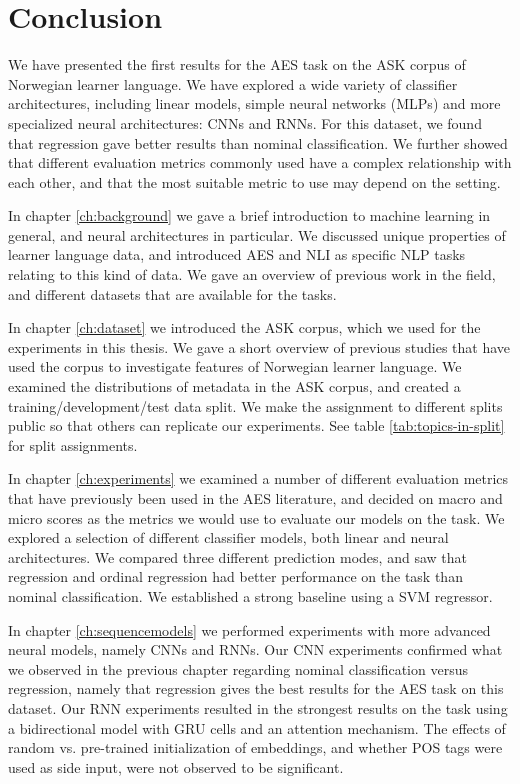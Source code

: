 \chapter{Conclusion} \label{ch:conclusion}

We have presented the first results for the \ac{AES} task on the ASK corpus
of Norwegian learner language. We have explored a wide variety of classifier
architectures, including linear models, simple neural networks (\acp{MLP})
and more specialized neural architectures: \acp{CNN} and \acp{RNN}. For this
dataset, we found that regression gave better results than nominal
classification. We further showed that different evaluation metrics commonly
used have a complex relationship with each other, and that the most suitable
metric to use may depend on the setting.

In chapter \ref{ch:background} we gave a brief introduction to machine
learning in general, and neural architectures in particular. We discussed
unique properties of learner language data, and introduced \ac{AES} and
\ac{NLI} as specific \ac{NLP} tasks relating to this kind of data. We gave an
overview of previous work in the field, and different datasets that are
available for the tasks.

In chapter \ref{ch:dataset} we introduced the ASK corpus, which we used for
the experiments in this thesis. We gave a short overview of previous studies
that have used the corpus to investigate features of Norwegian learner
language. We examined the distributions of metadata in the ASK corpus, and
created a training/development/test data split. We make the assignment to
different splits public so that others can replicate our experiments. See
table \ref{tab:topics-in-split} for split assignments.

In chapter \ref{ch:experiments} we examined a number of different evaluation
metrics that have previously been used in the \ac{AES} literature, and
decided on macro and micro \FI scores as the metrics we would use to evaluate
our models on the task. We explored a selection of different classifier
models, both linear and neural architectures. We compared three different
prediction modes, and saw that regression and ordinal regression had better
performance on the task than nominal classification. We established a strong
baseline using a \ac{SVM} regressor.

In chapter \ref{ch:sequencemodels} we performed experiments with more
advanced neural models, namely \acp{CNN} and \acp{RNN}. Our CNN experiments
confirmed what we observed in the previous chapter regarding nominal
classification versus regression, namely that regression gives the best
results for the \ac{AES} task on this dataset. Our \ac{RNN} experiments
resulted in the strongest results on the task using a bidirectional model
with GRU cells and an attention mechanism. The effects of random vs.
pre-trained initialization of embeddings, and whether \ac{POS} tags were used
as side input, were not observed to be significant.

